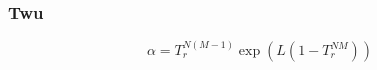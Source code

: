 \subsubsection{Twu\cite{twuequation}}
\begin{equation}
	\alpha = T_r^{N\left(M-1\right)}\exp{\left(L\left(1-T_r^{N M}\right)\right)}
\end{equation}